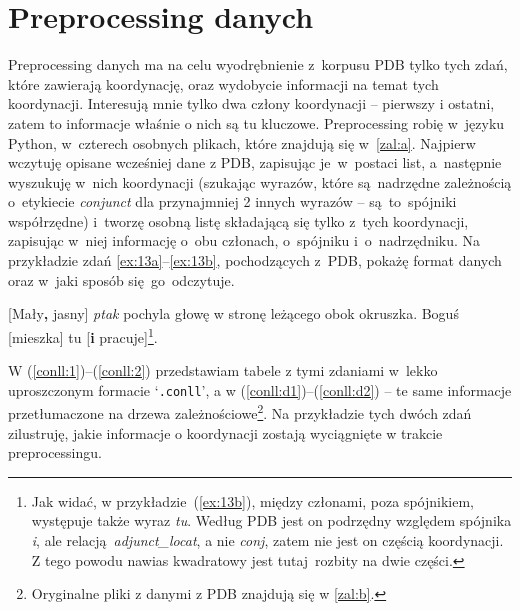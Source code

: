 \documentclass[licencjacka]{pracamgr_Kogni}
\begin{document}
    \section{Preprocessing danych}\label{sec:preprocessing-danych}
    Preprocessing danych ma na celu wyodrębnienie z~korpusu PDB tylko tych zdań, które zawierają koordynację, oraz wydobycie informacji na temat tych koordynacji.
    Interesują mnie tylko dwa człony koordynacji -- pierwszy i ostatni, zatem to informacje właśnie o nich są tu kluczowe.
    Preprocessing robię w~języku Python, w~czterech osobnych plikach, które znajdują się w~\ref{zal:a}.
    Najpierw wczytuję opisane wcześniej dane z PDB, zapisując je~w~postaci list, a~następnie wyszukuję w~nich koordynacji (szukając wyrazów, które są~nadrzędne zależnością o~etykiecie \textit{conjunct} dla przynajmniej 2 innych wyrazów -- są~to~spójniki współrzędne) i~tworzę osobną listę składającą się tylko z~tych koordynacji, zapisując w~niej informację o~obu członach, o~spójniku i~o~nadrzędniku.
    Na przykładzie zdań \ref{ex:13a}--\ref{ex:13b}, pochodzących z~PDB, pokażę format danych oraz w~jaki sposób się~go~odczytuje.
    \begin{exe}
        \ex
        {[Mały\textbf{\LARGE{,}} jasny] \textit{ptak} pochyla głowę w stronę leżącego obok okruszka.
            \label{ex:13a}}
        \ex
        {Boguś [mieszka] tu [\textbf{i} pracuje]\footnote{Jak widać, w przykładzie~(\ref{ex:13b}), między członami, poza spójnikiem, występuje także wyraz \textit{tu}. Według PDB jest on podrzędny względem spójnika \textit{i}, ale relacją~\textit{adjunct\_locat}, a nie \textit{conj}, zatem nie jest on częścią koordynacji. Z tego powodu nawias kwadratowy jest tutaj~rozbity na dwie części.}.
            \label{ex:13b}}
    \end{exe}
    W (\ref{conll:1})--(\ref{conll:2}) przedstawiam tabele z tymi zdaniami w~lekko uproszczonym formacie `\texttt{.conll}', a w (\ref{conll:d1})--(\ref{conll:d2}) -- te same informacje przetłumaczone na drzewa zależnościowe\footnote{Oryginalne pliki z danymi z PDB znajdują się w \ref{zal:b}.}. Na przykładzie tych dwóch zdań zilustruję, jakie informacje o koordynacji zostają wyciągnięte w trakcie preprocessingu.
    \begin{exe}
        \ex
        \label{conll:1}
    \end{exe}
\end{document}
